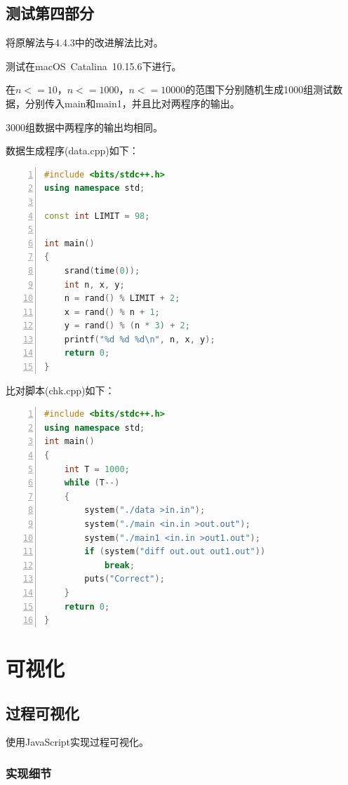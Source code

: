\documentclass{article}
\begin{document}
\subsection{测试第四部分}

将原解法与4.4.3中的改进解法比对。

测试在macOS\ Catalina\ 10.15.6下进行。

在$n<=10$，$n<=1000$，$n<=10000$的范围下分别随机生成1000组测试数据，分别传入main和main1，并且比对两程序的输出。

3000组数据中两程序的输出均相同。

数据生成程序(data.cpp)如下：

\begin{lstlisting}[language={C++},
    numbers=left,
    numberstyle=\tiny\consolas,
    basicstyle=\small\consolas]
#include <bits/stdc++.h>
using namespace std;

const int LIMIT = 98;

int main()
{
    srand(time(0));
    int n, x, y;
    n = rand() % LIMIT + 2;
    x = rand() % n + 1;
    y = rand() % (n * 3) + 2;
    printf("%d %d %d\n", n, x, y);
    return 0;
}
\end{lstlisting}

比对脚本(chk.cpp)如下：

\begin{lstlisting}[language={C++},
    numbers=left,
    numberstyle=\tiny\consolas,
    basicstyle=\small\consolas]
#include <bits/stdc++.h>
using namespace std;
int main()
{
    int T = 1000;
    while (T--)
    {
        system("./data >in.in");
        system("./main <in.in >out.out");
        system("./main1 <in.in >out1.out");
        if (system("diff out.out out1.out"))
            break;
        puts("Correct");
    }
    return 0;
}
\end{lstlisting}

\section{可视化}

\subsection{过程可视化}

使用JavaScript实现过程可视化。

\subsubsection{实现细节}
\end{document}
